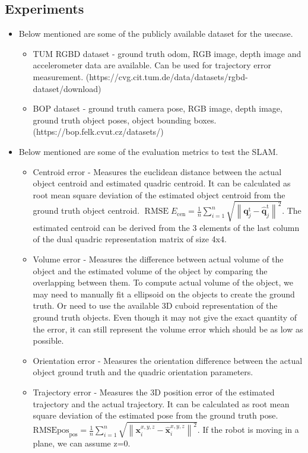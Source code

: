 \documentclass{article}
\begin{document}
\subsection{Experiments}
\begin{itemize}
\item Below mentioned are some of the publicly available dataset for the usecase.
\begin{itemize}
    \item TUM RGBD dataset\cite{rgbd} - ground truth odom, RGB image, depth image and accelerometer data are available. Can be used for trajectory error measurement. \newline (https://cvg.cit.tum.de/data/datasets/rgbd-dataset/download)
    \item BOP dataset - ground truth camera pose, RGB image, depth image, ground truth object poses, object bounding boxes.(https://bop.felk.cvut.cz/datasets/)
\end{itemize}
\item Below mentioned are some of the evaluation metrics to test the SLAM.
\begin{itemize}
    \item Centroid error - Measures the euclidean distance between the actual object centroid and estimated quadric centroid. It can be calculated as root mean square deviation of the estimated object centroid from the ground truth object centroid. $\operatorname{RMSE} E_{\mathrm{cen}}=\frac{1}{n} \sum_{i=1}^{n} \sqrt{\left\|\mathbf{q}_{j}^{\mathrm{t}}-\hat{\mathbf{q}}_{j}^{\mathrm{t}}\right\|^{2}}$. The estimated centroid can be derived from the 3 elements of the last column of the dual quadric representation matrix of size 4x4.\cite{sünderhauf2017dual}
    \item Volume error - Measures the difference between actual volume of the object and the estimated volume of the object by comparing the overlapping between them. To compute actual volume of the object, we may need to manually fit a ellipsoid on the objects to create the ground truth. Or need to use the available 3D cuboid representation of the ground truth objects. Even though it may not give the exact quantity of the error, it can still represent the volume error which should be as low as possible.
    \item Orientation error - Measures the orientation difference between the actual object ground truth and the quadric orientation parameters.
    \item Trajectory error - Measures the 3D position error of the estimated trajectory and the actual trajectory. It can be calculated as root mean square deviation of the estimated pose from the ground truth pose. $\mathrm{RMSE} \mathrm{pos}_{\mathrm{pos}}=\frac{1}{n} \sum_{i=1}^{n} \sqrt{\left\|\mathbf{x}_{i}^{x, y, z}-\hat{\mathbf{x}}_{i}^{x, y, z}\right\|^{2}}$. If the robot is moving in a plane, we can assume z=0.\cite{sünderhauf2017dual}

\end{itemize}
\end{itemize}
\end{document}

